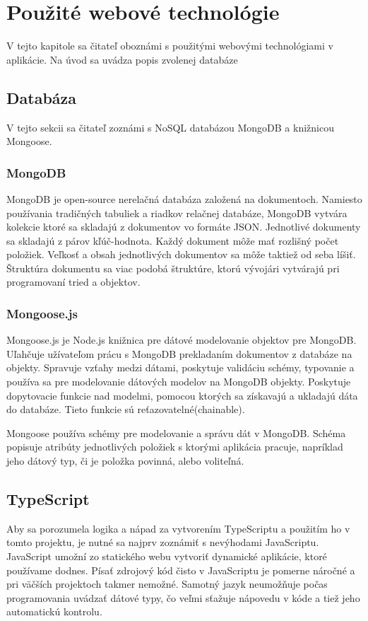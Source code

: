 \chapter{Použité webové technológie}
\label{kapitola3}
V tejto kapitole sa čitateľ oboznámi s použitými webovými technológiami v aplikácie. Na úvod sa uvádza popis zvolenej databáze

\section{Databáza}
V tejto sekcii sa čitateľ zoznámi s NoSQL databázou MongoDB a knižnicou Mongoose.

\subsection{MongoDB}
\label{mongodb}
MongoDB\cite{mongodb} je open-source nerelačná databáza založená na dokumentoch. Namiesto používania tradičných tabuliek a riadkov relačnej databáze, MongoDB vytvára kolekcie ktoré sa skladajú z dokumentov vo formáte JSON. Jednotlivé dokumenty sa skladajú z párov kľúč-hodnota. Každý dokument môže mať rozlišný počet položiek. Veľkosť a obsah jednotlivých dokumentov sa môže taktiež od seba líšiť. Štruktúra dokumentu sa viac podobá štruktúre, ktorú vývojári vytvárajú pri programovaní tried a objektov. 

\subsection{Mongoose.js}
\label{mongoose}
Mongoose.js je Node.js knižnica pre dátové modelovanie objektov pre MongoDB. Uľahčuje užívateľom prácu s MongoDB prekladaním dokumentov z databáze na objekty. Spravuje vzťahy medzi dátami, poskytuje validáciu schémy, typovanie a používa sa pre modelovanie dátových modelov na MongoDB objekty. Poskytuje dopytovacie funkcie nad modelmi, pomocou ktorých sa získavajú a ukladajú dáta do databáze. Tieto funkcie sú reťazovatelné(chainable). 

Mongoose používa schémy pre modelovanie a správu dát v MongoDB. Schéma popisuje atribúty jednotlivých položiek s ktorými aplikácia pracuje, napríklad jeho dátový typ, či je položka povinná, alebo voliteľná. 

\section{TypeScript}
\label{typescript}
Aby sa porozumela logika a nápad za vytvorením TypeScriptu a použitím ho v tomto projektu, je nutné sa najprv zoznámiť s nevýhodami JavaScriptu. JavaScript\cite{typescript} umožní zo statického webu vytvoriť dynamické aplikácie, ktoré používame dodnes. Písať zdrojový kód čisto v JavaScriptu je pomerne náročné a pri väčších projektoch takmer nemožné. Samotný jazyk neumožňuje počas programovania uvádzať dátové typy, čo veľmi sťažuje nápovedu v kóde a tiež jeho automatickú kontrolu.


